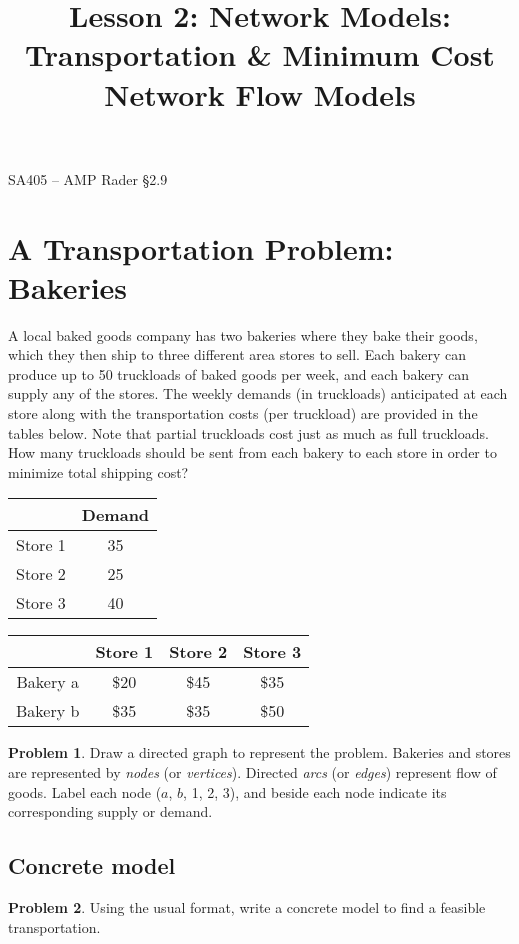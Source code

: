 \documentclass[11pt]{article}
\makeatletter
\theoremstyle{definition}
\newtheorem{problem}{Problem}
\renewcommand{\maketitle}{
  \noindent SA405 -- AMP \hfill Rader \S 2.9 \\

  \begin{center}\Large{\textbf{\@title}}\end{center}
}
\makeatother
\begin{document}
  
\title{Lesson 2: Network Models: Transportation \& Minimum Cost Network Flow Models}


\maketitle
\bigskip
\vspace{-1cm}

\section{A Transportation Problem:  Bakeries}
A local baked goods company has two bakeries where they bake their goods, which they then ship to three different area stores to sell.  Each bakery can produce up to 50 truckloads of baked goods per week, and each bakery can supply any of the stores.  The weekly demands (in truckloads) anticipated at each store along with the transportation costs (per truckload) are provided in the tables below.  Note that partial truckloads cost just as much as full truckloads.  How many truckloads should be sent from each bakery to each store in order to minimize total shipping cost?
\begin{center}
\begin{tabular}{|c|c|}
\hline
 & Demand \\
\hline
Store 1 & 35 \\
\hline
Store 2 & 25 \\
\hline
Store 3 & 40 \\
\hline
\end{tabular}
\hspace{1cm}
\begin{tabular}{|c|c|c|c|}
\hline
& Store 1 & Store 2 & Store 3 \\
\hline
Bakery a & \$20 & \$45 & \$35 \\
\hline
Bakery b & \$35 & \$35 & \$50 \\
\hline
\end{tabular}
\end{center}

\begin{problem}
Draw a directed graph to represent the problem.  Bakeries and stores are represented by \emph{nodes} (or \emph{vertices}).  Directed \emph{arcs} (or \emph{edges}) represent flow of goods. Label each node ($a$, $b$, 1, 2, 3), and beside each node indicate its corresponding supply or demand. \newpage
\end{problem}

\subsection{Concrete model}
\begin{problem}
Using the usual format, write a concrete model to find a feasible transportation.
\end{problem}
\end{document}
